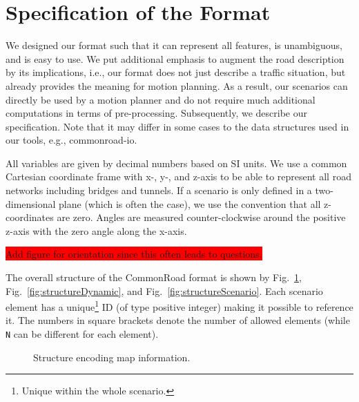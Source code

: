 

\section{Specification of the Format}

We designed our format such that it can represent all features, is unambiguous, and is easy to use.
We put additional emphasis to augment the road description by its implications, i.e., our format does not just describe a traffic situation, but already provides the meaning for motion planning.
As a result, our scenarios can directly be used by a motion planner and do not require much additional computations in terms of pre-processing.
Subsequently, we describe our specification.
Note that it may differ in some cases to the data structures used in our tools, e.g., commonroad-io.

All variables are given by decimal numbers based on SI units. We use a common Cartesian coordinate frame with x-, y-, and z-axis to be able to represent all road networks including bridges and tunnels.
If a scenario is only defined in a two-dimensional plane (which is often the case), we use the convention that all z-coordinates are zero.
Angles are measured counter-clockwise around the positive z-axis with the zero angle along the x-axis.

\colorbox{red}{Add figure for orientation since this often leads to questions.}

The overall structure of the CommonRoad format is shown by Fig.~\ref{fig:structureMap}, Fig.~\ref{fig:structureDynamic}, and Fig.~\ref{fig:structureScenario}.
Each scenario element has a unique\footnote{Unique within the whole scenario.} ID (of type positive integer) making it possible to reference it.
The numbers in square brackets denote the number of allowed elements (while \texttt{N} can be different for each element).


\begin{figure}[!htpb]
	\small
	\caption{Structure encoding map information.}
	\label{fig:structureMap}
\end{figure}


